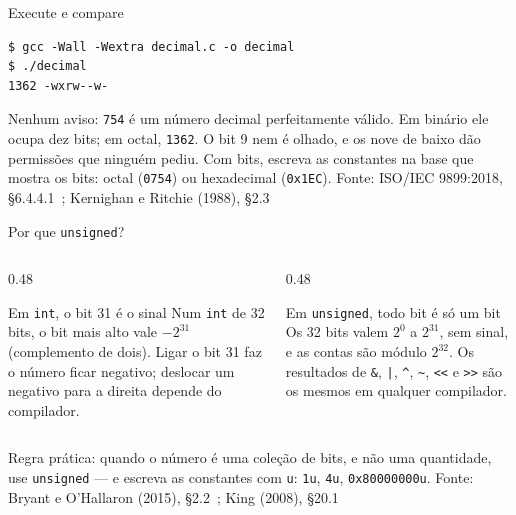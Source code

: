 \documentclass[aspectratio=169]{beamer}
\newcommand{\til}{\textasciitilde}
\newcommand{\cir}{\textasciicircum}
\newcommand{\bits}[3]{%
  \foreach \b [count=\k from 0] in {#3} {
    \node[bit\b] at (#1+0.42*\k, #2) {\b};
  }
}
\newcommand{\bitsr}[3]{%
  \foreach \b [count=\k from 0] in {#3} {
    \node[bitr] at (#1+0.42*\k, #2) {\b};
  }
}
\newcommand{\fonte}[1]{\vfill\hfill{\scriptsize\textcolor{UFSGray}{Fonte: #1}}}
\begin{document}
\begin{frame}[fragile]{Execute e compare}
\begin{lstlisting}[style=shellStyle]
$ gcc -Wall -Wextra decimal.c -o decimal
$ ./decimal
1362 -wxrw--w-
\end{lstlisting}
  \begin{center}
  \end{center}
  \small Nenhum aviso: \texttt{754} é um número decimal perfeitamente válido.
  Em binário ele ocupa dez bits; em octal, \texttt{1362}. O bit 9 nem é
  olhado, e os nove de baixo dão permissões que ninguém pediu. Com bits,
  escreva as constantes na base que mostra os bits: octal (\texttt{0754})
  ou hexadecimal (\texttt{0x1EC}).
  \fonte{ISO/IEC 9899:2018, §6.4.4.1~\cite{iso2018c17};
    Kernighan e Ritchie (1988), §2.3~\cite{kernighan1988c}}
\end{frame}

\begin{frame}{Por que \texttt{unsigned}?}
  \begin{columns}[T]
    \begin{column}{0.48\textwidth}
      \begin{block}{Em \texttt{int}, o bit 31 é o sinal}
        \small Num \texttt{int} de 32 bits, o bit mais alto vale $-2^{31}$
        (complemento de dois). Ligar o bit 31 faz o número ficar negativo;
        deslocar um negativo para a direita depende do compilador.
      \end{block}
    \end{column}
    \begin{column}{0.48\textwidth}
      \begin{block}{Em \texttt{unsigned}, todo bit é só um bit}
        \small Os 32 bits valem $2^0$ a $2^{31}$, sem sinal, e as contas
        são módulo $2^{32}$. Os resultados de \texttt{\&}, \texttt{|},
        \texttt{\cir}, \texttt{\til}, \texttt{<{}<} e \texttt{>{}>} são os mesmos
        em qualquer compilador.
      \end{block}
    \end{column}
  \end{columns}
  \medskip
  \small Regra prática: quando o número é uma coleção de bits, e não uma
  quantidade, use \texttt{unsigned} --- e escreva as constantes com
  \texttt{u}: \texttt{1u}, \texttt{4u}, \texttt{0x80000000u}.
  \fonte{Bryant e O'Hallaron (2015), §2.2~\cite{bryant2015computer};
    King (2008), §20.1~\cite{king2008c}}
\end{frame}
\end{document}
